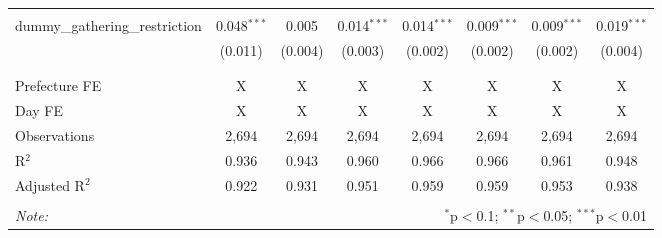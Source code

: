 \begin{table}[!htbp]
\begin{tabular}{@{\extracolsep{-15pt}}lccccccc}
  & & & & & & & \\ 
 dummy\_gathering\_restriction & 0.048$^{***}$ & 0.005 & 0.014$^{***}$ & 0.014$^{***}$ & 0.009$^{***}$ & 0.009$^{***}$ & 0.019$^{***}$ \\ 
  & (0.011) & (0.004) & (0.003) & (0.002) & (0.002) & (0.002) & (0.004) \\ 
  & & & & & & & \\ 
\hline \\[-1.8ex] 
Prefecture FE & X & X & X & X & X & X & X \\ 
Day FE & X & X & X & X & X & X & X \\ 
Observations & 2,694 & 2,694 & 2,694 & 2,694 & 2,694 & 2,694 & 2,694 \\ 
R$^{2}$ & 0.936 & 0.943 & 0.960 & 0.966 & 0.966 & 0.961 & 0.948 \\ 
Adjusted R$^{2}$ & 0.922 & 0.931 & 0.951 & 0.959 & 0.959 & 0.953 & 0.938 \\ 
\hline 
\hline \\[-1.8ex] 
\textit{Note:}  & \multicolumn{7}{r}{$^{*}$p$<$0.1; $^{**}$p$<$0.05; $^{***}$p$<$0.01} \\ 
\end{tabular} 
\end{table} 
